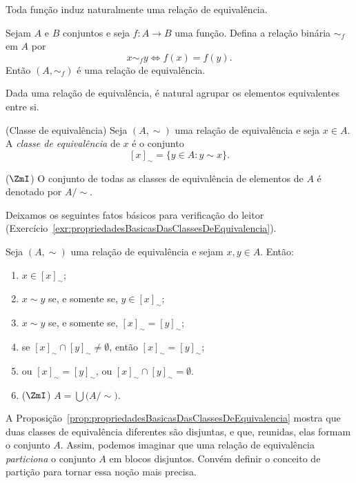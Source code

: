 Toda função induz naturalmente uma relação de equivalência.
\begin{example}[$\BST$]\label{exa:relacaoDeEquivalenciaInduzidaPorFuncao}
    Sejam $A$ e $B$ conjuntos e seja $f : A \to B$ uma função.
    Defina a relação binária $\sim_f$ em $A$ por
    \[
    x \sim_f y \iff f(x) = f(y).
    \]
    Então $(A, \sim_f)$ é uma relação de equivalência.
\end{example}

Dada uma relação de equivalência, é natural agrupar os elementos equivalentes entre si.

\begin{definition}[$\BST$](Classe de equivalência)\label{def:classeDeEquivalencia}
    Seja $(A, \sim)$ uma relação de equivalência e seja $x \in A$.
    A \emph{classe de equivalência} de $x$ é o conjunto
    \[
    [x]_{\sim} = \{y \in A : y \sim x\}.
    \]

    ($\ZmI$) O conjunto de todas as classes de equivalência de elementos de $A$ é denotado por $A/{\sim}$.
\end{definition}

Deixamos os seguintes fatos básicos para verificação do leitor (Exercício~\ref{exr:propriedadesBasicasDasClassesDeEquivalencia}).

\begin{proposition}[$\BST$]\label{prop:propriedadesBasicasDasClassesDeEquivalencia}
    Seja $(A, \sim)$ uma relação de equivalência e sejam $x, y \in A$. Então:
    \begin{enumerate}[label=(\alph*)]
        \item $x \in [x]_{\sim}$;
        \item $x \sim y$ se, e somente se, $y \in [x]_{\sim}$;
        \item $x \sim y$ se, e somente se, $[x]_{\sim}=[y]_{\sim}$;
        \item se $[x]_{\sim} \cap [y]_{\sim} \neq \emptyset$, então $[x]_{\sim}=[y]_{\sim}$;
        \item ou $[x]_{\sim}=[y]_{\sim}$, ou $[x]_{\sim} \cap [y]_{\sim}=\emptyset$.
        \item ($\ZmI$) $\displaystyle A=\bigcup \Big(A/{\sim}\Big)$.
    \end{enumerate}
\end{proposition}

A Proposição~\ref{prop:propriedadesBasicasDasClassesDeEquivalencia} mostra que duas classes de equivalência diferentes são disjuntas, e que, reunidas, elas formam o conjunto $A$.
Assim, podemos imaginar que uma relação de equivalência \emph{particiona} o conjunto $A$ em blocos disjuntos.
Convém definir o conceito de partição para tornar essa noção mais precisa.

